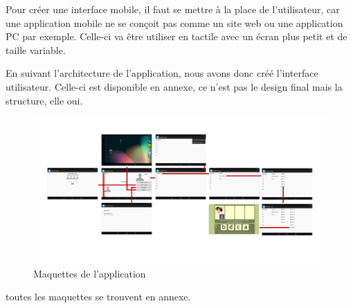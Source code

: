 Pour créer une interface mobile, il faut se mettre à la place de l'utilisateur, car une application mobile ne se conçoit pas comme un site web ou une application PC par exemple. Celle-ci va être utiliser en tactile avec un écran plus petit et de taille variable.


En suivant l'architecture de l'application, nous avons donc créé l'interface utilisateur. Celle-ci est disponible en annexe, ce n'est pas le design final mais la structure, elle oui.

\begin{figure}[H]
\begin{center}
\includegraphics[width=20cm,angle=90]{images/pepit_wireframe}
\end{center}
\caption{Maquettes de l'application}
\label{Maquettes de l'application}
\end{figure}

toutes les maquettes se trouvent en annexe.
